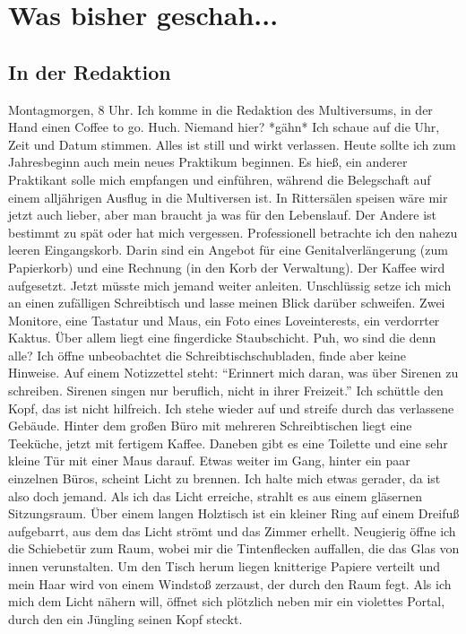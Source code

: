 \documentclass[final]{multiversum}
\begin{document}
\makemultititle
%

\section{Was bisher geschah...}

\subsection{In der Redaktion}
Montagmorgen, 8 Uhr. 
Ich komme in die Redaktion des Multiversums, in der Hand einen Coffee to go.
Huch. Niemand hier? *gähn*
Ich schaue auf die Uhr, Zeit und Datum stimmen.
Alles ist still und wirkt verlassen.
Heute sollte ich zum Jahresbeginn auch mein neues Praktikum beginnen.
Es hieß, ein anderer Praktikant solle mich empfangen und einführen, während die Belegschaft auf einem alljährigen Ausflug in die Multiversen ist.
In Rittersälen speisen wäre mir jetzt auch lieber, aber man braucht ja was für den Lebenslauf.
Der Andere ist bestimmt zu spät oder hat mich vergessen.
Professionell betrachte ich den nahezu leeren Eingangskorb.
Darin sind ein Angebot für eine Genitalverlängerung (zum Papierkorb) und eine Rechnung (in den Korb der Verwaltung).
Der Kaffee wird aufgesetzt.
Jetzt müsste mich jemand weiter anleiten.
Unschlüssig setze ich mich an einen zufälligen Schreibtisch und lasse meinen Blick darüber schweifen.
Zwei Monitore, eine Tastatur und Maus, ein Foto eines Loveinterests, ein verdorrter Kaktus.
Über allem liegt eine fingerdicke Staubschicht.
Puh, wo sind die denn alle?
Ich öffne unbeobachtet die Schreibtischschubladen, finde aber keine Hinweise.
Auf einem Notizzettel steht: \enquote{Erinnert mich daran, was über Sirenen zu schreiben. Sirenen singen nur beruflich, nicht in ihrer Freizeit.}
Ich schüttle den Kopf, das ist nicht hilfreich.
Ich stehe wieder auf und streife durch das verlassene Gebäude.
Hinter dem großen Büro mit mehreren Schreibtischen liegt eine Teeküche, jetzt mit fertigem Kaffee.
Daneben gibt es eine Toilette und eine sehr kleine Tür mit einer Maus darauf.
Etwas weiter im Gang, hinter ein paar einzelnen Büros, scheint Licht zu brennen.
Ich halte mich etwas gerader, da ist also doch jemand.
Als ich das Licht erreiche, strahlt es aus einem gläsernen Sitzungsraum.
Über einem langen Holztisch ist ein kleiner Ring auf einem Dreifuß aufgebarrt, aus dem das Licht strömt und das Zimmer erhellt.
Neugierig öffne ich die Schiebetür zum Raum, wobei mir die Tintenflecken auffallen, die das Glas von innen verunstalten.
Um den Tisch herum liegen knitterige Papiere verteilt und mein Haar wird von einem Windstoß zerzaust, der durch den Raum fegt.
Als ich mich dem Licht nähern will, öffnet sich plötzlich neben mir ein violettes Portal, durch den ein Jüngling seinen Kopf steckt.
\end{document}
